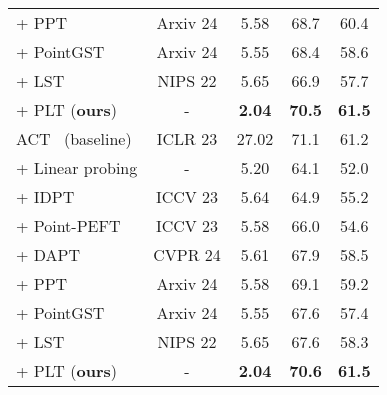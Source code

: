 \begin{table}
\begin{tabular}{lcccc}
    + PPT~\cite{zhang2024positional} & Arxiv 24 & 5.58 & 68.7 & 60.4\\
    + PointGST~\cite{liang2024parameter} & Arxiv 24 & 5.55  & 68.4 & 58.6 \\
    + LST~\cite{sung2022lst} & NIPS 22 & 5.65 & 66.9 & 57.7 \\
    \rowcolor{linecolor!40}+ PLT (\textbf{ours})& - & \textbf{2.04}  & \textbf{70.5} & \textbf{61.5} \\
    \midrule
    ACT~\cite{dong2022autoencoders} (baseline) &  ICLR 23 & 27.02 & 71.1 & 61.2 \\ 
    + Linear probing & - & 5.20  & 64.1  & 52.0  \\
    + IDPT~\cite{zha2023instance} & ICCV 23 & 5.64  & 64.9  & 55.2  \\
    + Point-PEFT~\cite{tang2024point} & ICCV 23 & 5.58  & 66.0  & 54.6  \\
    + DAPT~\cite{zhou2024dynamic} & CVPR 24 & 5.61  & 67.9 & 58.5 \\
    + PPT~\cite{zhang2024positional} & Arxiv 24 & 5.58 & 69.1 & 59.2\\
    + PointGST~\cite{liang2024parameter} & Arxiv 24 & 5.55  & 67.6 & 57.4 \\
    + LST~\cite{sung2022lst} & NIPS 22 & 5.65 & 67.6 & 58.3 \\
    \rowcolor{linecolor!40}+ PLT (\textbf{ours})& - & \textbf{2.04}  & \textbf{70.6} & \textbf{61.5} \\
    \bottomrule
    \end{tabular}
  \label{tab:semantic_segmentation}
\end{table}
